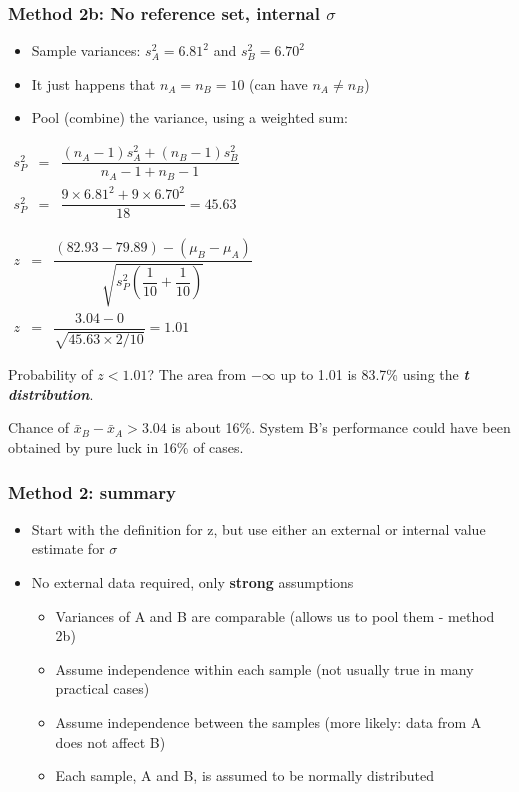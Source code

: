 \begin{frame}\frametitle{Method 2b: No reference set, internal $\sigma$}
	\begin{itemize}
		\item	Sample variances: $s_A^2 = 6.81^2$ and $s_B^2 = 6.70^2$
		\item	It just happens that $n_A = n_B = 10$ (can have $n_A \neq n_B$)
		\item	Pool (combine) the variance, using a weighted sum:
	\end{itemize}

	$
	\begin{array}{rcccl}
		s_P^2 &=& \dfrac{(n_A -1) s_A^2 + (n_B-1)s_B^2}{n_A - 1 + n_B - 1} \\
		s_P^2 &=& \dfrac{9\times 6.81^2 + 9 \times 6.70^2}{18} = 45.63
	\end{array}
	$
	
	\vspace{8pt}
	$
	\begin{array}{rcccl}
		z &=& \dfrac{(82.93 - 79.89) - (\mu_B - \mu_A)}{\sqrt{s_P^2 \left(\dfrac{1}{10} + \dfrac{1}{10}\right)}} \\
		z &=& \dfrac{3.04 - 0}{\sqrt{45.63 \times 2/10}} = 1.01
	\end{array}
	$

	\vspace{8pt}
	Probability of $z < 1.01$? The area from $-\infty$ up to 1.01 is 83.7\% using the \textbf{\emph{t distribution}}.

	Chance of $\bar{x}_B - \bar{x}_A > 3.04$ is about 16\%. System B's performance could have been obtained by pure luck in 16\% of cases.
\end{frame}

\begin{frame}\frametitle{Method 2: summary}
	\begin{itemize}
		\item	Start with the definition for z, but use either an external or internal value estimate for $\sigma$
		\item	No external data required, only \textbf{strong} assumptions
		\begin{itemize}
			\item	Variances of A and B are comparable (allows us to pool them - method 2b)
			\item	Assume independence within each sample (not usually true in many practical cases)
			\item	Assume independence between the samples (more likely: data from A does not affect B)
			\item	Each sample, A and B, is assumed to be normally distributed
		\end{itemize}
	\end{itemize}
\end{frame}

